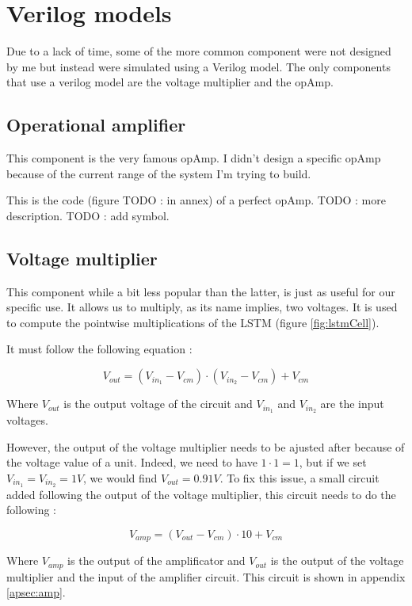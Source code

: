 \section{Verilog models}
\label{sec:models}

Due to a lack of time, some of the more common component were not designed by me but instead were simulated using a Verilog model. The only components that use a verilog model are the voltage multiplier and the \ac{opAmp}.

\subsection{Operational amplifier}

This component is the very famous \ac{opAmp}. I didn't design a specific \ac{opAmp} because of the current range of the system I'm trying to build.

This is the code (figure TODO : in annex) of a perfect \ac{opAmp}. TODO : more description.
TODO : add symbol.

\subsection{Voltage multiplier}

This component while a bit less popular than the latter, is just as useful for our specific use. It allows us to multiply, as its name implies, two voltages. It is used to compute the pointwise multiplications of the \ac{LSTM} (figure \ref{fig:lstmCell}).

It must follow the following equation :

\begin{equation}
  V_{out}=(V_{in_1}-V_{cm})\cdot (V_{in_2}-V_{cm}) + V_{cm}
\end{equation}

Where $V_{out}$ is the output voltage of the circuit and $V_{in_1}$ and $V_{in_2}$ are the input voltages.

However, the output of the voltage multiplier needs to be ajusted after because of the voltage value of a unit. Indeed, we need to have $1\cdot 1=1$, but if we set $V_{in_1}=V_{in_2}=1V$, we would find $V_{out}=0.91V$. To fix this issue, a small circuit added following the output of the voltage multiplier, this circuit needs to do the following :

\begin{equation}
  V_{amp}=(V_{out}-V_{cm})\cdot10+V_{cm}
\end{equation}

Where $V_{amp}$ is the output of the amplificator and $V_{out}$ is the output of the voltage multiplier and the input of the amplifier circuit.
This circuit is shown in appendix \ref{apsec:amp}.
